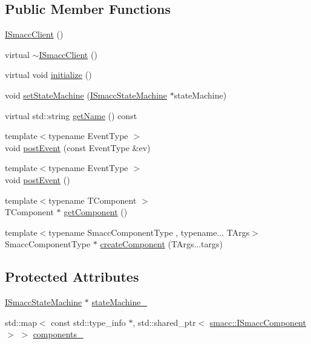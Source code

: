 \subsection*{Public Member Functions}
\begin{DoxyCompactItemize}
\item 
\hyperlink{classsmacc_1_1ISmaccClient_a40222ad8b9b7962755434025b1fd5ae7}{I\+Smacc\+Client} ()
\item 
virtual \hyperlink{classsmacc_1_1ISmaccClient_a030e17771bf2e404a6fad97273c4d7f4}{$\sim$\+I\+Smacc\+Client} ()
\item 
virtual void \hyperlink{classsmacc_1_1ISmaccClient_a974ebb6ad6cf812e7b9de6b78b3d901f}{initialize} ()
\item 
void \hyperlink{classsmacc_1_1ISmaccClient_a28fd6ca2bcf9c5e57f3cc16fb0a076d3}{set\+State\+Machine} (\hyperlink{classsmacc_1_1ISmaccStateMachine}{I\+Smacc\+State\+Machine} $\ast$state\+Machine)
\item 
virtual std\+::string \hyperlink{classsmacc_1_1ISmaccClient_a20846aabfd1de832aa27d7a8237a1742}{get\+Name} () const 
\item 
{\footnotesize template$<$typename Event\+Type $>$ }\\void \hyperlink{classsmacc_1_1ISmaccClient_a46cbc0d695214efe40d29247323bfc80}{post\+Event} (const Event\+Type \&ev)
\item 
{\footnotesize template$<$typename Event\+Type $>$ }\\void \hyperlink{classsmacc_1_1ISmaccClient_a21a79203cb44fc717d4d977c190327c6}{post\+Event} ()
\item 
{\footnotesize template$<$typename T\+Component $>$ }\\T\+Component $\ast$ \hyperlink{classsmacc_1_1ISmaccClient_adef78db601749ca63c19e74a27cb88cc}{get\+Component} ()
\item 
{\footnotesize template$<$typename Smacc\+Component\+Type , typename... T\+Args$>$ }\\Smacc\+Component\+Type $\ast$ \hyperlink{classsmacc_1_1ISmaccClient_aef02e196c5537837558cacea53b12f2f}{create\+Component} (T\+Args...\+targs)
\end{DoxyCompactItemize}
\subsection*{Protected Attributes}
\begin{DoxyCompactItemize}
\item 
\hyperlink{classsmacc_1_1ISmaccStateMachine}{I\+Smacc\+State\+Machine} $\ast$ \hyperlink{classsmacc_1_1ISmaccClient_a926e4f2ae796def63d48dca389a48c47}{state\+Machine\+\_\+}
\item 
std\+::map$<$ const std\+::type\+\_\+info $\ast$, std\+::shared\+\_\+ptr$<$ \hyperlink{classsmacc_1_1ISmaccComponent}{smacc\+::\+I\+Smacc\+Component} $>$ $>$ \hyperlink{classsmacc_1_1ISmaccClient_ab983e85d296c9660f5943c1d511634ce}{components\+\_\+}
\end{DoxyCompactItemize}
